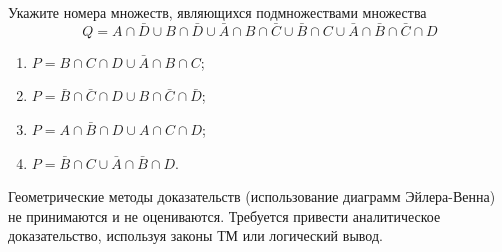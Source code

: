 \question
Укажите номера множеств, являющихся подмножествами множества
\begin{equation*}
	Q = A \cap \bar{D} \cup B \cap \bar{D} \cup \bar{A} \cap B \cap \bar{C} \cup \bar{B} \cap C \cup \bar{A} \cap \bar{B} \cap \bar{C} \cap D
\end{equation*}

\begin{enumerate}
	\renewcommand{\labelenumi}{\arabic{enumi})}
	\item $P = B \cap C \cap D \cup \bar{A} \cap B \cap C$;
	\item $P = \bar{B} \cap \bar{C} \cap D \cup B \cap \bar{C} \cap \bar{D}$;
	\item $P = A \cap \bar{B} \cap D \cup A \cap C \cap D$;
	\item $P = \bar{B} \cap C \cup \bar{A} \cap \bar{B} \cap D$.
\end{enumerate}

Геометрические методы доказательств (использование диаграмм Эйлера-Венна) не принимаются и не оцениваются. Требуется привести аналитическое доказательство, используя законы ТМ или логический вывод.

